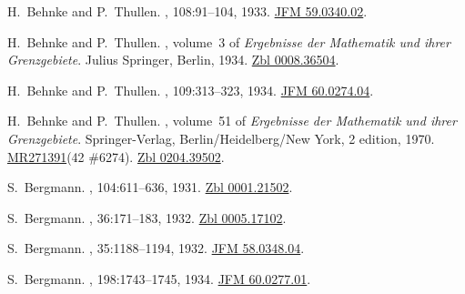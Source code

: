\documentclass[11pt,a4paper, final, twoside]{article}
\numberwithin{equation}{section}
\begin{document}
\begin{appendices}
\begin{thebibliography}{100}
H.~Behnke and P.~Thullen.
, 108:91--104, 1933.
\newblock \href{http://zbmath.org/?q=an:59.0340.02}{JFM 59.0340.02}.

H.~{Behnke} and P.~{Thullen}.
,
  volume~3 of {\em {Ergebnisse der Mathematik und ihrer Grenzgebiete}}.
\newblock Julius Springer, Berlin, 1934.
\newblock \href{http://zbmath.org/?q=an:0008.36504}{Zbl 0008.36504}.

H.~{Behnke} and P.~{Thullen}.
, 109:313--323, 1934.
\newblock \href{http://zbmath.org/?q=an:60.0274.04}{JFM 60.0274.04}.

H.~Behnke and P.~Thullen.
,
  volume~51 of {\em {Ergebnisse der Mathematik und ihrer Grenzgebiete}}.
\newblock Springer-Verlag, Berlin/Heidelberg/New York, 2 edition, 1970.
\newblock \href{http://www.ams.org/mathscinet-getitem?mr=271391}{MR271391}(42
  \#6274). \href{http://zbmath.org/?q=an:0204.39502}{Zbl 0204.39502}.

S.~Bergmann.
, 104:611--636, 1931.
\newblock \href{http://zbmath.org/?q=an:0001.21502}{Zbl 0001.21502}.

S.~Bergmann.
, 36:171--183, 1932.
\newblock \href{http://zbmath.org/?q=an:0005.17102}{Zbl 0005.17102}.

S.~Bergmann.
,
  35:1188--1194, 1932.
\newblock \href{http://zbmath.org/?q=an:58.0348.04}{JFM 58.0348.04}.

S.~Bergmann.
, 198:1743--1745, 1934.
\newblock \href{http://zbmath.org/?q=an:60.0277.01}{JFM 60.0277.01}.


\end{thebibliography}
\end{appendices}
\end{document}

